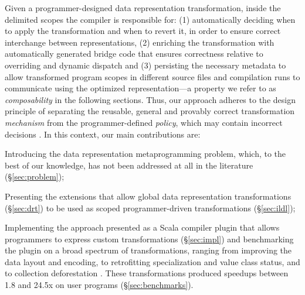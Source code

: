 Given a programmer-designed data representation transformation,
inside the delimited scopes the compiler is responsible for:
(1) automatically deciding when to apply the transformation and when to revert it, in
order to ensure correct interchange between representations, (2)
enriching the transformation with automatically generated bridge code
that ensures correctness relative to overriding and dynamic dispatch
and (3) persisting the necessary metadata to allow transformed program
scopes in different source files and compilation runs to communicate
using the optimized representation---a property we refer to as
\emph{composability} in the following sections. Thus, our approach
adheres to the design principle of separating the reusable, general
and provably correct transformation \emph{mechanism} from the programmer-defined
\emph{policy}, which may contain incorrect decisions
\cite{lampson-mechanism-policy}. In this context, our main contributions are:
\vspace{0.25em}
\begin{compactitem}
  \item Introducing the data representation metaprogramming problem, which, to the best of our knowledge, has not been addressed at all in the literature (\S\ref{sec:problem});
  \item Presenting the extensions that allow global data representation transformations (\S\ref{sec:drt}) to be used as scoped programmer-driven transformations (\S\ref{sec:ildl});
  \item Implementing the approach presented as a Scala compiler plugin \cite{ildl-plugin} that allows programmers to express custom transformations (\S\ref{sec:impl}) and benchmarking the plugin on a broad spectrum of transformations, ranging from improving the data layout and encoding, to retrofitting specialization and value class status, and to collection deforestation \cite{wadler-deforestation}. These transformations produced  speedups between 1.8 and 24.5x on user programs (\S\ref{sec:benchmarks}).
\end{compactitem}

